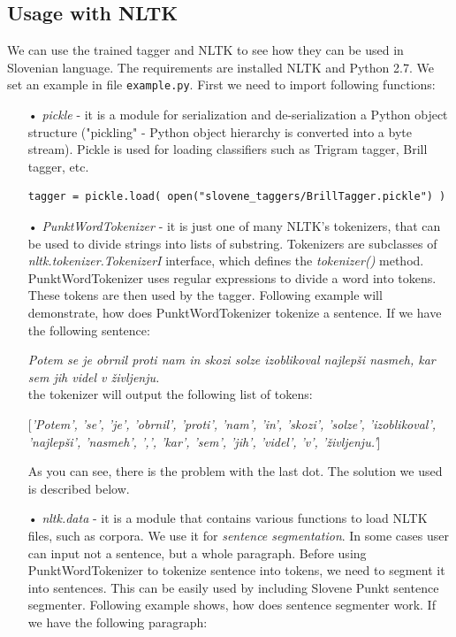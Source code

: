 \documentclass[10pt, conference, compsocconf]{IEEEtran}
\begin{document}
\subsection{Usage with NLTK} %

We can use the trained tagger and NLTK to see how they can be used in Slovenian language. The requirements are installed NLTK and Python 2.7. We set an example in file \texttt{example.py}.
First we need to import following functions:
\begin{itemize}
\item[•] \textit{pickle} - it is a module for serialization and de-serialization a Python object structure ("pickling" - Python object hierarchy is converted into a byte stream). Pickle is used for loading classifiers such as Trigram tagger, Brill tagger, etc.
\begin{lstlisting}
tagger = pickle.load( open("slovene_taggers/BrillTagger.pickle") )
\end{lstlisting}

\item[•] \textit{PunktWordTokenizer} \cite{tokenizer} - it  is just one of many NLTK's tokenizers, that can be used to divide strings into lists of substring. Tokenizers are subclasses of \textit{nltk.tokenizer.TokenizerI} interface, which defines the \textit{tokenizer()} method. PunktWordTokenizer uses regular expressions to divide a word into tokens. These tokens are then used by the tagger. Following example will demonstrate, how does PunktWordTokenizer tokenize a sentence. If we have the following sentence:

\textit{Potem se je obrnil proti nam in skozi solze izoblikoval najlepši nasmeh, kar sem jih videl v življenju.}\\
the tokenizer will output the following list of tokens:

[\textit{'Potem', 'se', 'je', 'obrnil', 'proti', 'nam', 'in', 'skozi', 'solze', 'izoblikoval', 'najlepši', 'nasmeh', ',', 'kar', 'sem', 'jih', 'videl', 'v', 'življenju.'}]

As you can see, there is the problem with the last dot. The solution we used is described below.

\item[•] \textit{nltk.data} - it is a module that contains various functions to load NLTK files, such as corpora. We use it for \textit{sentence segmentation}. In some cases user can input not a sentence, but a whole paragraph. Before using PunktWordTokenizer to tokenize sentence into tokens, we need to segment it into sentences. This can be easily used by including Slovene Punkt sentence segmenter. Following example shows, how does sentence segmenter work. If we have the following paragraph:


\end{itemize}
\end{document}
